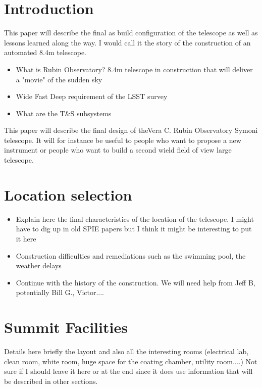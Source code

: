 \section{Introduction}

 This paper will describe the final as build configuration of the telescope as well as lessons learned along the way.  I would call it the story of the construction of an automated 8.4m telescope.
\begin{itemize}
 \item  What is Rubin Observatory? 8.4m telescope in construction  that will deliver a "movie" of the sudden sky
 \item Wide Fast Deep requirement of the LSST survey
 \item  What are the T\&S subsystems
\end{itemize}

This paper will describe the final design of theVera C. Rubin Observatory Symoni telescope. It will for instance be useful to people who want to propose a new instrument or people who want to build a second wield field of view large telescope. 
\section{Location selection}
\begin{itemize}
\item Explain here the final characteristics of the location of the telescope. I might have to dig up in old SPIE papers but I think it might be interesting to put it here
\item Construction difficulties and remediations such as the swimming pool, the weather delays
\item Continue with the history of the construction. We will need help from Jeff B, potentially Bill G., Victor....
\end{itemize}

\section{Summit Facilities} 
Details here briefly the layout and also all the interesting rooms (electrical lab, clean room, white room, huge space for the coating chamber, utility room....)
Not sure if I should leave it here or at the end since it does use information that will be described in other sections. 



